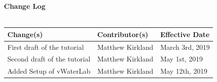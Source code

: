 \documentclass[12pt]{extarticle}
\begin{document}
\pagebreak
\textbf{Change Log}\\\\

\begin{tabularx}{\linewidth}{*3{| >{\centering\arraybackslash}X}@{}|}
	\hline
	\textbf{Change(s)} & \textbf{Contributor(s)} & \textbf{Effective Date} \\ \hline
	First draft of the tutorial & Matthew Kirkland & March 3rd, 2019 \\ \hline
	Second draft of the tutorial & Matthew Kirkland & May 1st, 2019 \\ \hline
	Added Setup of vWaterLab & Matthew Kirkland & May 12th, 2019 \\ \hline
\end{tabularx}

\pagebreak


{}
\end{document}
